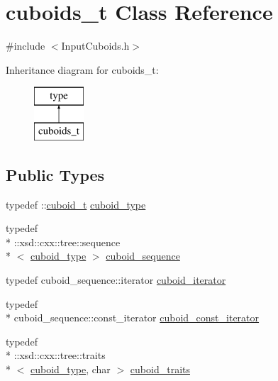\hypertarget{classcuboids__t}{\section{cuboids\-\_\-t Class Reference}
\label{classcuboids__t}
}


{\ttfamily \#include $<$Input\-Cuboids.\-h$>$}

Inheritance diagram for cuboids\-\_\-t\-:\begin{figure}[H]
\begin{center}
\leavevmode
\includegraphics[height=2.000000cm]{classcuboids__t}
\end{center}
\end{figure}
\subsection*{Public Types}
\begin{DoxyCompactItemize}
\item 
typedef \-::\hyperlink{classcuboid__t}{cuboid\-\_\-t} \hyperlink{classcuboids__t_a7c920a1afd759302a5672d5ba2eb9707}{cuboid\-\_\-type}
\item 
typedef \\*
\-::xsd\-::cxx\-::tree\-::sequence\\*
$<$ \hyperlink{classcuboids__t_a7c920a1afd759302a5672d5ba2eb9707}{cuboid\-\_\-type} $>$ \hyperlink{classcuboids__t_ae3d3abd50bb0570dfe0d4d2d97485261}{cuboid\-\_\-sequence}
\item 
typedef cuboid\-\_\-sequence\-::iterator \hyperlink{classcuboids__t_a63fead1ce5b1d5d61e641a72d80349e9}{cuboid\-\_\-iterator}
\item 
typedef \\*
cuboid\-\_\-sequence\-::const\-\_\-iterator \hyperlink{classcuboids__t_a4c6feaefcda62b64615c74892b835b04}{cuboid\-\_\-const\-\_\-iterator}
\item 
typedef \\*
\-::xsd\-::cxx\-::tree\-::traits\\*
$<$ \hyperlink{classcuboids__t_a7c920a1afd759302a5672d5ba2eb9707}{cuboid\-\_\-type}, char $>$ \hyperlink{classcuboids__t_a070c3f6592d095cd861a6e1f31271ae2}{cuboid\-\_\-traits}
\end{DoxyCompactItemize}
